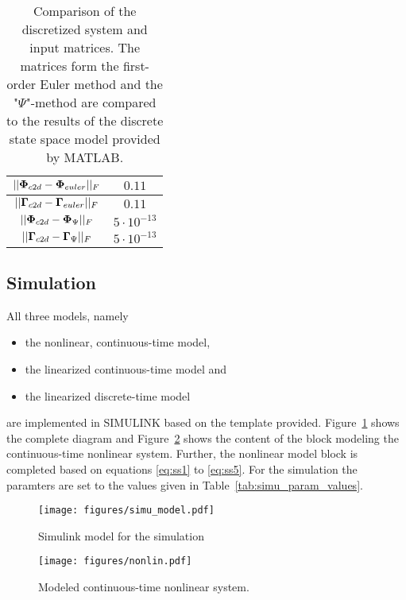 \begin{table}[h]
	\centering
	\begin{tabular}{c|c}
	\hline
		 $||\boldsymbol{\Phi}_{c2d} - \boldsymbol{\Phi}_{euler}||_F$& $0.11$ \\\hline
		 $||\boldsymbol{\Gamma}_{c2d} - \boldsymbol{\Gamma}_{euler}||_F$& $0.11$ \\\hline
		 $||\boldsymbol{\Phi}_{c2d} - \boldsymbol{\Phi}_{\Psi}||_F$& $5 \cdot 10^{-13}$ \\\hline
		 $||\boldsymbol{\Gamma}_{c2d} - \boldsymbol{\Gamma}_{\Psi}||_F$& $5 \cdot 10^{-13}$ \\\hline
	\end{tabular}
	\caption{Comparison of the discretized system and input matrices. The matrices form the first-order Euler method and the "$\Psi$"-method are compared to the results of the discrete state space model provided by MATLAB.}
	\label{tab:disc_comp}
\end{table}

\subsection{Simulation}
All three models, namely
\begin{itemize}
	\item the nonlinear, continuous-time model,
	\item the linearized continuous-time model and
	\item the linearized discrete-time model
\end{itemize}
are implemented in SIMULINK based on the template provided. 
Figure~\ref{fig:simu_simulink} shows the complete diagram and Figure~\ref{fig:simu_nonlin_simulink} shows the content of the block modeling the continuous-time nonlinear system.
Further, the nonlinear model block is completed based on equations \eqref{eq:ss1} to \eqref{eq:ss5}.
For the simulation the paramters are set to the values given in Table~\ref{tab:simu_param_values}.

\begin{figure}[h]
	\centering
	\texttt{[image: figures/simu\_model.pdf]}
	\caption{Simulink model for the simulation}
	\label{fig:simu_simulink}
\end{figure}
\begin{figure}[h]
	\centering
	\texttt{[image: figures/nonlin.pdf]}
	\caption{Modeled continuous-time nonlinear system.}
	\label{fig:simu_nonlin_simulink}
\end{figure}

